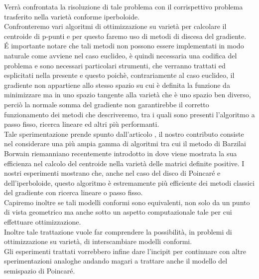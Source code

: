 \documentclass[a4paper, 12pt]{article}
\begin{document}
Verrà confrontata la risoluzione di tale problema con il corrispettivo problema trasferito nella varietà conforme iperboloide.\\
Confronteremo vari algoritmi di ottimizzazione su varietà per calcolare il centroide di p-punti e per questo faremo uso di metodi di discesa del gradiente.\\
\'E importante notare che tali metodi non possono essere implementati in modo naturale come avviene nel caso euclideo, è quindi necessaria una codifica del problema e sono necessari particolari strumenti, che verranno trattati ed esplicitati nella presente e questo poichè, contrariamente al caso euclideo, il gradiente non appartiene allo stesso spazio su cui è definita la funzione da minimizzare ma in uno spazio tangente alla varietà che è uno spazio ben diverso, perciò la normale somma del gradiente non garantirebbe il corretto funzionamento dei metodi che descriveremo, tra i quali sono presenti l'algoritmo a passo fisso, ricerca lineare ed altri più performanti.\\
Tale sperimentazione prende spunto dall'articolo \cite{Wilson}, il nostro contributo consiste nel considerare una più ampia gamma di algoritmi tra cui il metodo di Barzilai Borwain riemanniano recentemente introdotto in \cite{Iannazzo} dove viene mostrata la sua efficienza nel calcolo del centroide nella varietà delle matrici definite positive. I nostri esperimenti mostrano che, anche nel caso del disco di Poincaré e dell'iperboloide, questo algoritmo è estremamente più efficiente dei metodi classici del gradiente con ricerca lineare o passo fisso.\\
Capiremo inoltre se tali modelli conformi sono equivalenti, non solo da un punto di vista geometrico ma anche sotto un aspetto computazionale tale per cui effettuare ottimizzazione.\\
Inoltre tale trattazione vuole far comprendere la possibilità, in problemi di ottimizzazione su varietà, di interscambiare modelli conformi.\\
Gli esperimenti trattati vorrebbero infine dare l'incipit per continuare con altre sperimentazioni analoghe andando magari a trattare anche il modello del semispazio di Poincaré.
\end{document}
